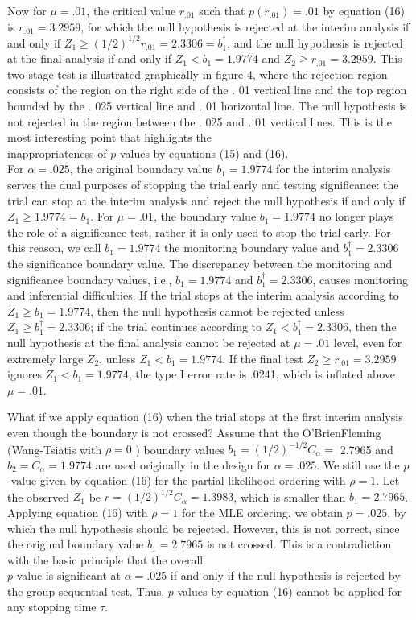 \documentclass[10pt]{article}
\begin{document}
Now for $\mu=.01$, the critical value $r_{.01}$ such that $p\left(r_{.01}\right)=.01$ by equation (16) is $r_{.01}=3.2959$, for which the null hypothesis is rejected at the interim analysis if and only if $Z_{1} \geq(1 / 2)^{1 / 2} r_{.01}=2.3306=b_{1}^{\dagger}$, and the null hypothesis is rejected at the final analysis if and only if $Z_{1}<b_{1}=1.9774$ and $Z_{2} \geq r_{.01}=3.2959$. This two-stage test is illustrated graphically in figure 4, where the rejection region consists of the region on the right side of the . 01 vertical line and the top region bounded by the . 025 vertical line and . 01 horizontal line. The null hypothesis is not rejected in the region between the . 025 and . 01 vertical lines. This is the most interesting point that highlights the\\
inappropriateness of $p$-values by equations (15) and (16).\\
For $\alpha=.025$, the original boundary value $b_{1}=1.9774$ for the interim analysis serves the dual purposes of stopping the trial early and testing significance: the trial can stop at the interim analysis and reject the null hypothesis if and only if $Z_{1} \geq 1.9774=b_{1}$. For $\mu=.01$, the boundary value $b_{1}=1.9774$ no longer plays the role of a significance test, rather it is only used to stop the trial early. For this reason, we call $b_{1}=1.9774$ the monitoring boundary value and $b_{1}^{\dagger}=2.3306$ the significance boundary value. The discrepancy between the monitoring and significance boundary values, i.e., $b_{1}=1.9774$ and $b_{1}^{\dagger}=2.3306$, causes monitoring and inferential difficulties. If the trial stops at the interim analysis according to $Z_{1} \geq b_{1}=1.9774$, then the null hypothesis cannot be rejected unless $Z_{1} \geq b_{1}^{\dagger}=2.3306$; if the trial continues according to $Z_{1}<b_{1}^{\dagger}=2.3306$, then the null hypothesis at the final analysis cannot be rejected at $\mu=.01$ level, even for extremely large $Z_{2}$, unless $Z_{1}<b_{1}=1.9774$. If the final test $Z_{2} \geq r_{.01}=3.2959$ ignores $Z_{1}<b_{1}=1.9774$, the type I error rate is .0241, which is inflated above $\mu=.01$.

What if we apply equation (16) when the trial stops at the first interim analysis even though the boundary is not crossed? Assume that the O'BrienFleming (Wang-Tsiatis with $\rho=0$ ) boundary values $b_{1}=(1 / 2)^{-1 / 2} C_{\alpha}=$ 2.7965 and $b_{2}=C_{\alpha}=1.9774$ are used originally in the design for $\alpha=.025$. We still use the $p$-value given by equation (16) for the partial likelihood ordering with $\rho=1$. Let the observed $Z_{1}$ be $r=(1 / 2)^{1 / 2} C_{\alpha}=1.3983$, which is smaller than $b_{1}=2.7965$. Applying equation (16) with $\rho=1$ for the MLE ordering, we obtain $p=.025$, by which the null hypothesis should be rejected. However, this is not correct, since the original boundary value $b_{1}=2.7965$ is not crossed. This is a contradiction with the basic principle that the overall\\
$p$-value is significant at $\alpha=.025$ if and only if the null hypothesis is rejected by the group sequential test. Thus, $p$-values by equation (16) cannot be applied for any stopping time $\tau$.
\end{document}
